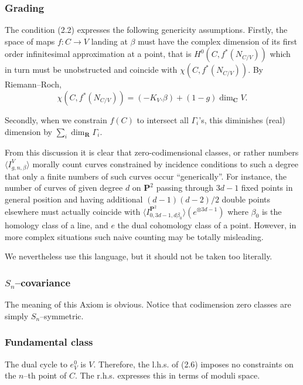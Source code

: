 \documentclass[reqno]{amsart}
\theoremstyle{definition}
\begin{document}
\smallskip

\subsubsection{Grading}
The condition (2.2) expresses the following
genericity assumptions. Firstly, the space of maps $f\colon C\to V$
landing at $\beta $ must have the complex dimension of its first
order infinitesimal approximation at a point, that is
$H^0(C,f^*(N_{C/V}))$ which in turn must be unobstructed
and coincide with $\chi (C,f^*(N_{C/V}))$.
By Riemann--Roch,
\[
  \chi (C,f^*(N_{C/V}))=(-K_V.\beta )+(1-g)\dim_{\mathbf{C}}V.
\]

Secondly, when we constrain $f(C)$ to intersect all $\Gamma_i$'s,
this diminishes (real) dimension by $\sum_i\dim_{\mathbf{R}}
\Gamma_i$.

\smallskip

From this discussion it is clear that zero-codimensional classes,
or rather numbers $\langle I^V_{g,n,\beta}\rangle$ morally count
curves constrained by incidence conditions to such a degree
that only a finite numbers of such curves occur ``generically''.
For instance, the number of curves of given degree $d$ on
$\mathbf{P}^2$ passing through $3d-1$ fixed points in general position and
having additional $(d-1)(d-2)/2$ double points elsewhere
must actually coincide with $\langle I^{\mathbf{P}^2}_{0,3d-1,d\beta_0}
\rangle (e^{\otimes 3d-1})$ where $\beta_0$ is the homology
class of a line, and $e$ the dual cohomology class of a point.
However, in more complex situations such naive counting
may be totally misleading.

\smallskip

We nevertheless use this language, but it should not be taken
too  literally.


\subsubsection{$S_n$--covariance}
The meaning of this Axiom is
obvious. Notice that codimension zero classes are simply
$S_n$--symmetric.


\subsubsection{Fundamental class}
The dual cycle to $e^0_V$ is
$V$. Therefore, the l.h.s. of (2.6) imposes no constraints
on the $n$--th point of $C$. The r.h.s. expresses this
in terms of moduli space.
\end{document}
